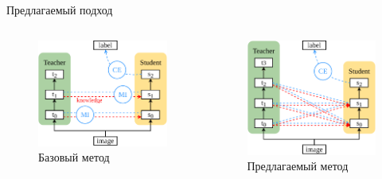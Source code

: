 \documentclass{beamer}
\begin{document}
\begin{frame}{Предлагаемый подход}

    \begin{columns}[c]
        \begin{figure}
            \includegraphics[width=1.0\textwidth]{ahn_diagram.pdf}
            \caption{Базовый метод}
        \end{figure}

        \begin{figure}
            \includegraphics[width=1.0\textwidth]{our_diagram.pdf}
            \caption{Предлагаемый метод}
        \end{figure}
    \end{columns}


\end{frame}
\end{document}

